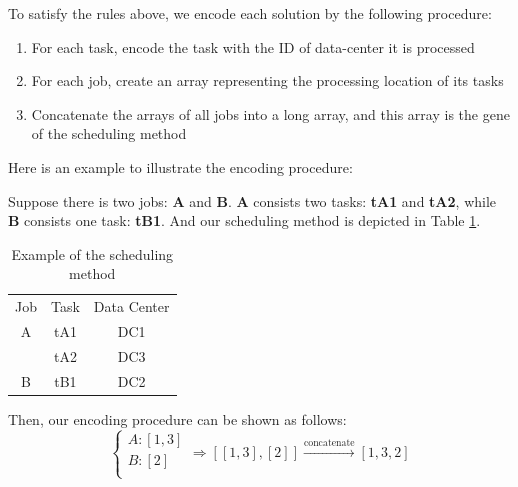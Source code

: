 \documentclass{llncs}
\begin{document}
To satisfy the rules above, we encode each solution by the following procedure:
\begin{enumerate}
\item
For each task, encode the task with the ID of data-center it is processed
\item
For each job, create an array representing the processing location of its tasks
\item
Concatenate the arrays of all jobs into a long array, and this array is the gene of the scheduling method
\end{enumerate}

Here is an example to illustrate the encoding procedure:

Suppose there is two jobs: \textbf{A} and \textbf{B}. \textbf{A} consists two tasks: \textbf{tA1} and \textbf{tA2}, while \textbf{B} consists one task: \textbf{tB1}. And our scheduling method is depicted in Table \ref{tab:scheduling method}.
\begin{table}
    \centering
    \caption{Example of the scheduling method}
    \begin{tabular}{c|c|c}
        Job & Task & Data Center \\
          A & tA1  & DC1         \\
            & tA2  & DC3         \\
          B & tB1  & DC2         \\
    \end{tabular}
    \label{tab:scheduling method}
\end{table}
Then, our encoding procedure can be shown as follows:
$$
\begin{cases}
	A:\left[ 1,3 \right]\\
	B:\left[ 2 \right]\\
\end{cases}\Rightarrow \left[ \left[ 1,3 \right] ,\left[ 2 \right] \right] \xrightarrow{\mathrm{concatenate}}\left[ 1,3,2 \right] 
$$
\end{document}

